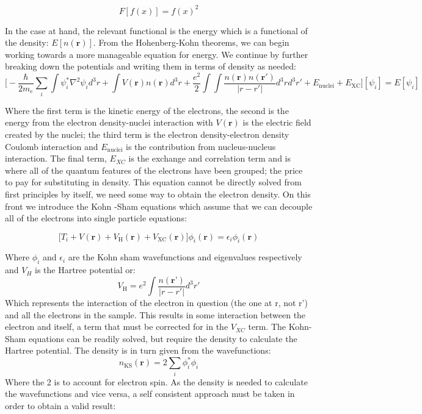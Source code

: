 \begin{equation}
F[f(x)] = f(x)^2 
\end{equation}

 In the case at hand, the relevant functional is the energy which is a functional of the density: $E[n(\textbf{r})]$.  From the Hohenberg-Kohn theorems, we can begin working towards a more manageable equation for energy.  We continue by further breaking down the potentials and writing them in terms of density as needed: 
\begin{equation}
\bigg[-\frac{\hbar}{2m_e} \sum_{i} \int \psi_i^* \nabla^2\psi_id^3r + \int V(\textbf{r})n(\textbf{r})d^3r + \frac{e^2}{2} \int \int \frac{n(\textbf{r})n(\textbf{r}')}{|r-r'|}d^3r d^3r' + E_{\mathrm{nuclei}} + E_{\mathrm{XC}}\bigg][\psi_i] = E[\psi_i]
\end{equation}

Where the first term is the kinetic energy of the electrons, the second is the energy from the electron density-nuclei interaction with $V(\textbf{r})$ is the electric field created by the nuclei; the third term is the electron density-electron density Coulomb interaction and $E_{\mathrm{nuclei}}$ is the contribution from nucleus-nucleus interaction.  The final term, $E_{XC}$ is the exchange and correlation term and is where all of the quantum features of the electrons have been grouped; the price to pay for substituting in density. This equation cannot be directly solved from first principles by itself, we need some way to obtain the electron density.  On this front we introduce the Kohn -Sham equations which assume that we can decouple all of the electrons into single particle equations: 

\begin{equation}
    \bigg[T_i + V(\textbf{r}) + V_{\mathrm{H}}(\textbf{r}) + V_{\mathrm{XC}}(\textbf{r})\bigg] \phi_i(\textbf{r}) = \epsilon_i \phi_i(\textbf{r})
    \label{ks_eq}
\end{equation}

Where $\phi_i$ and $\epsilon_i$ are the Kohn sham wavefunctions and eigenvalues respectively and $V_H$ is the Hartree potential or: 
\begin{equation}
    V_\mathrm{H} = e^2 \int \frac{n(\textbf{r'})}{|r-r'|}d^3r'
\end{equation}
Which represents the interaction of the electron in question (the one at r, not r') and all the electrons in the sample.  This results in some interaction between the electron and itself, a term that must be corrected for in the $V_{XC}$ term.  The Kohn-Sham equations can  be readily solved, but require the density to calculate the Hartree potential.  The density is in turn given from the wavefunctions: 
\begin{equation}
	n_{\mathrm{KS}}(\textbf{r}) = 2 \sum_{i} \phi_i^*\phi_i
	\label{KS_density}
\end{equation}
Where the 2 is to account for electron spin.  As the density is needed to calculate the wavefunctions and vice versa, a self consistent approach must be taken in order to obtain a valid result:  

